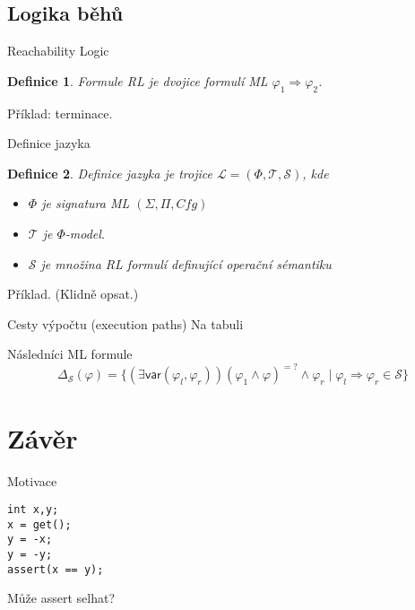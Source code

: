 \documentclass[11pt]{beamer}
\newtheorem{dfn}{Definice}
\newcommand{\mlSignature}{\ensuremath{\left( \Sigma, \Pi, \mathit{Cfg} \right)}}
\begin{document}

\subsection{Logika běhů}

\begin{frame}{Reachability Logic}

\begin{dfn}
Formule RL je dvojice formulí ML $\varphi_1 \Rightarrow \varphi_2$.
\end{dfn}
\pause
Příklad: terminace.

\end{frame}


\begin{frame}{Definice jazyka}

\begin{dfn}
Definice jazyka je trojice $\mathcal{L} = \left( \Phi, \mathcal{T}, \mathcal{S} \right)$, kde
\begin{itemize}
\pause \item $\Phi$ je signatura ML $\mlSignature$
\pause \item $\mathcal{T}$ je $\Phi$-model.
\pause \item $\mathcal{S}$ je množina RL formulí \pause definující operační sémantiku
\end{itemize}
\end{dfn}
\pause
Příklad. (Klidně opsat.)
\end{frame}

\begin{frame}{Cesty výpočtu (execution paths)}
Na tabuli
\end{frame}

\begin{frame}{Následníci ML formule}
\begin{equation*}
\Delta_{\mathcal{S}}\left( \varphi \right) =
\lbrace \left( \exists \mathsf{var} \left( \varphi_l , \varphi_r \right) \right) \left( \varphi_1 \land \varphi \right)^{=?} \land \varphi_r \mid \varphi_l \Rightarrow \varphi_r \in \mathcal{S} \rbrace
\end{equation*}
\end{frame}

\section{Závěr}


\begin{frame}[fragile]{Motivace}

\begin{lstlisting}
int x,y;
x = get();
y = -x;
y = -y;
assert(x == y);
\end{lstlisting}

Může assert selhat?

\end{frame}
\end{document}
